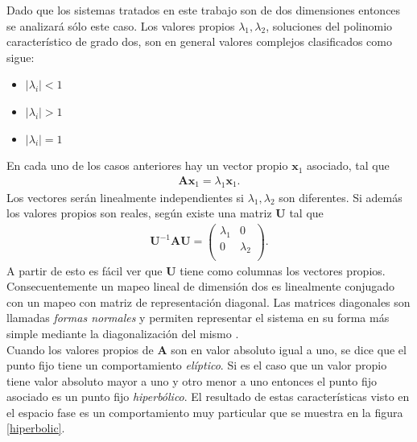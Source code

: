 Dado que los sistemas tratados en este trabajo son de dos dimensiones entonces se analizará sólo este caso. Los valores propios $\lambda_{1}, \lambda_{2}$, soluciones del polinomio característico de grado dos, son en general valores complejos clasificados como sigue:
\begin{itemize}
\item $\vert \lambda_{i}\vert<1$
\item $\vert \lambda_{i}\vert>1$
\item $\vert \lambda_{i}\vert=1$
\end{itemize}
En cada uno de los casos anteriores hay un vector propio $\mathbf{x}_{1}$ asociado, tal que 
\begin{eqnarray}
\mathbf{A}\mathbf{x}_{1}=\lambda_{1}\mathbf{x}_{1}.
\end{eqnarray}
Los vectores serán linealmente independientes si $\lambda_{1},\lambda_{2}$ son diferentes. Si además los valores propios son reales, según \cite{Friedberg} existe una matriz $\mathbf{U}$ tal que 
\begin{eqnarray}
\mathbf{U}^{-1}\mathbf{A}\mathbf{U} = \begin{pmatrix}
\lambda_{1} & 0\\
0 & \lambda_{2}\\
\end{pmatrix}.
\end{eqnarray}
A partir de esto es fácil ver que $\mathbf{U}$ tiene como columnas los vectores propios. Con\-se\-cuen\-te\-men\-te un mapeo lineal de dimensión dos es linealmente conjugado con un mapeo con matriz de representación diagonal. Las matrices diagonales son llamadas \textit{formas normales} y permiten representar el sistema en su forma más simple mediante la diagonalización del mismo \citep{arnold}.\\

Cuando los valores propios de $\mathbf{A}$ son en valor absoluto igual a uno, se dice que el punto fijo tiene un comportamiento \textit{elíptico}. Si es el caso que un valor propio tiene valor absoluto mayor a uno y otro menor a uno entonces el punto fijo asociado es un punto fijo \textit{hiperbólico}. El resultado de estas características visto en el espacio fase es un comportamiento muy particular que se muestra en la figura \ref{hiperbolic}. \\

